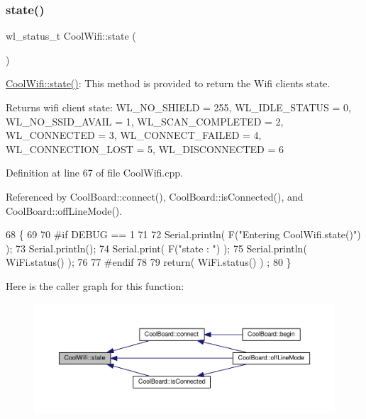 \subsubsection{\texorpdfstring{state()}{state()}}
{\footnotesize\ttfamily wl\+\_\+status\+\_\+t Cool\+Wifi\+::state (\begin{DoxyParamCaption}{ }\end{DoxyParamCaption})}

\hyperlink{classCoolWifi_a1c7b4d82a4098d346e7593dce92039fa}{Cool\+Wifi\+::state()}\+: This method is provided to return the Wifi client\textquotesingle{}s state. \begin{DoxyReturn}{Returns}
wifi client state\+: W\+L\+\_\+\+N\+O\+\_\+\+S\+H\+I\+E\+LD = 255, W\+L\+\_\+\+I\+D\+L\+E\+\_\+\+S\+T\+A\+T\+US = 0, W\+L\+\_\+\+N\+O\+\_\+\+S\+S\+I\+D\+\_\+\+A\+V\+A\+IL = 1, W\+L\+\_\+\+S\+C\+A\+N\+\_\+\+C\+O\+M\+P\+L\+E\+T\+ED = 2, W\+L\+\_\+\+C\+O\+N\+N\+E\+C\+T\+ED = 3, W\+L\+\_\+\+C\+O\+N\+N\+E\+C\+T\+\_\+\+F\+A\+I\+L\+ED = 4, W\+L\+\_\+\+C\+O\+N\+N\+E\+C\+T\+I\+O\+N\+\_\+\+L\+O\+ST = 5, W\+L\+\_\+\+D\+I\+S\+C\+O\+N\+N\+E\+C\+T\+ED = 6 
\end{DoxyReturn}


Definition at line 67 of file Cool\+Wifi.\+cpp.



Referenced by Cool\+Board\+::connect(), Cool\+Board\+::is\+Connected(), and Cool\+Board\+::off\+Line\+Mode().


\begin{DoxyCode}
68 \{
69 
70 \textcolor{preprocessor}{#if DEBUG == 1 }
71 
72     Serial.println( F(\textcolor{stringliteral}{"Entering CoolWifi.state()"}) );
73     Serial.println();   
74     Serial.print( F(\textcolor{stringliteral}{"state : "}) );
75     Serial.println( WiFi.status() );
76 
77 \textcolor{preprocessor}{#endif}
78     
79     \textcolor{keywordflow}{return}( WiFi.status() ) ;
80 \}
\end{DoxyCode}
Here is the caller graph for this function\+:
\nopagebreak
\begin{figure}[H]
\begin{center}
\leavevmode
\includegraphics[width=350pt]{classCoolWifi_a1c7b4d82a4098d346e7593dce92039fa_icgraph}
\end{center}
\end{figure}


